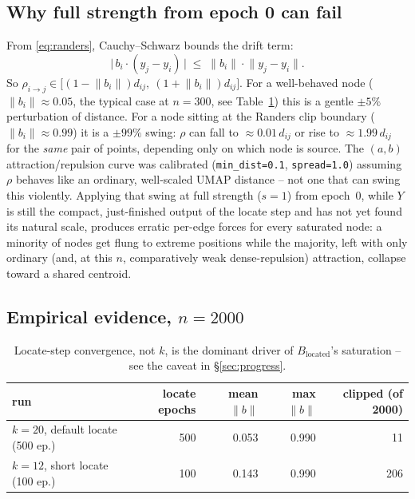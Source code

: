 \documentclass[11pt]{article}
\begin{document}
\subsection{Why full strength from epoch 0 can fail}

From \eqref{eq:randers}, Cauchy--Schwarz bounds the drift term:
\begin{equation}
\big|\,b_i\cdot(y_j-y_i)\,\big| \;\le\; \lVert b_i\rVert\cdot\lVert y_j-y_i\rVert.
\end{equation}
So $\rho_{i\to j}\in\big[(1-\lVert b_i\rVert)d_{ij},\ (1+\lVert b_i\rVert)d_{ij}\big]$. For a
well-behaved node ($\lVert b_i\rVert\approx0.05$, the typical case at $n=300$, see
Table~\ref{tab:clip}) this is a gentle $\pm5\%$ perturbation of distance. For a node sitting at the
Randers clip boundary ($\lVert b_i\rVert\approx0.99$) it is a $\pm99\%$ swing: $\rho$ can fall to
$\approx0.01\,d_{ij}$ or rise to $\approx1.99\,d_{ij}$ for the \emph{same} pair of points, depending
only on which node is source. The $(a,b)$ attraction/repulsion curve was calibrated
(\texttt{min\_dist=0.1}, \texttt{spread=1.0}) assuming $\rho$ behaves like an ordinary,
well-scaled UMAP distance -- not one that can swing this violently. Applying that swing at full
strength ($s=1$) from epoch~0, while $Y$ is still the compact, just-finished output of the locate
step and has not yet found its natural scale, produces erratic per-edge forces for every saturated
node: a minority of nodes get flung to extreme positions while the majority, left with only
ordinary (and, at this $n$, comparatively weak dense-repulsion) attraction, collapse toward a
shared centroid.

\subsection{Empirical evidence, $n=2000$}
\label{sec:ramp-data}

\begin{table}[h]
\centering
\begin{tabular}{@{}lrrrr@{}}
\toprule
run & locate epochs & mean $\lVert b\rVert$ & max $\lVert b\rVert$ & clipped (of 2000) \\
\midrule
$k=20$, default locate (500 ep.) & 500 & 0.053 & 0.990 & 11 \\
$k=12$, short locate (100 ep.) & 100 & 0.143 & 0.990 & 206 \\
\bottomrule
\end{tabular}
\caption{Locate-step convergence, not $k$, is the dominant driver of $B_{\mathrm{located}}$'s
saturation -- see the caveat in \S\ref{sec:progress}.}
\label{tab:clip}
\end{table}
\end{document}
